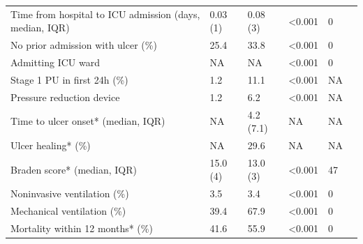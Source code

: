 \documentclass{ws-procs11x85}
\begin{document}
\begin{table}[H]
\begin{adjustbox}{width=1\textwidth}
\begin{tabular}{llllll}
\hspace{1cm} Time from hospital to ICU admission (days, median, IQR)              & 0.03 (1)        & 0.08 (3)                         & \textless 0.001  & 0                   &  \\
\hspace{1cm} No prior admission with ulcer (\%)           & 25.4                                    & 33.8                                & \textless 0.001  & 0                       &  \\
\hspace{1cm} Admitting ICU ward              & NA        & NA                         & \textless 0.001  & 0                   &  \\
\hspace{1cm} Stage 1 PU in first 24h (\%)   & 1.2                                      & 11.1                      & \textless 0.001               & NA   &                      \\
\hspace{1cm} Pressure reduction device   & 1.2                                      & 6.2                      & \textless 0.001               & NA   &                      \\
\hspace{1cm} Time to ulcer onset* (median, IQR)            & NA                                      & 4.2 (7.1)                      & NA               & NA                      &  \\
\hspace{1cm} Ulcer healing* (\%)             & NA                                      & 29.6                    & NA               & NA                      &  \\
\hspace{1cm} Braden score* (median, IQR)                      & 15.0 (4)                              & 13.0 (3)                          & \textless 0.001  & 47                      &  \\
\hspace{1cm} Noninvasive ventilation (\%)                 & 3.5                                     & 3.4                                 & \textless 0.001  & 0                       &  \\
\hspace{1cm} Mechanical ventilation (\%)                  & 39.4                                    & 67.9                                & \textless 0.001  & 0                       &  \\
\hspace{1cm} Mortality within 12 months* (\%)              & 41.6                                      & 55.9                                  & \textless 0.001  & 0                       &  \\

\end{tabular}
\end{adjustbox}
\end{table}
\end{document}
